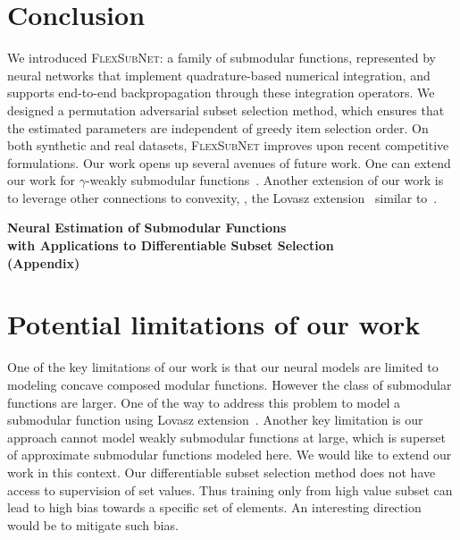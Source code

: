 \documentclass{article}
\newcommand{\our}{\textsc{Flex\-Sub\-Net}}
\renewcommand{\cite}{\citep}
\def\ztitle{Neural Estimation of Submodular Functions\\ with Applications to  Differentiable Subset Selection}
\begin{document}
% 
\section{Conclusion}
\label{sec:end}

We introduced \our: a family of submodular functions, represented by neural networks that implement quadrature-based numerical integration, and supports end-to-end backpropagation through these integration operators. We designed a permutation adversarial subset selection method, which ensures that the estimated parameters are independent of greedy item selection order.  On both synthetic and real datasets, \our{} improves upon recent competitive formulations. 
%
Our work opens up several avenues of future work.  One can extend our work for $\gamma$-weakly submodular functions~\cite{elenberg2016restricted}. 
Another  extension of our work is to leverage other connections to convexity, \eg, the Lovasz extension~\cite{lovas0,bach2} similar to~\citet{karalias2021neural}.


\newpage
%
%




 
\newpage
\onecolumn
\appendix
% 

\begin{center}
\Large\bfseries\ztitle \\ (Appendix)\\
\end{center}



 \section{Potential limitations of our work}
\label{app:our-lim}

One of the key limitations of our work is that our neural models are limited to modeling concave composed modular functions. However the class of submodular functions are larger. One of the way to address this problem to model a submodular function using Lovasz extension~\cite{lovas0,lovas1}. Another key limitation is our approach cannot model weakly submodular functions at large, which is superset of approximate submodular functions modeled here. We would like to extend our work in this context. Our differentiable subset selection method does not have access to supervision of set values. Thus training only from high value subset can lead to high bias towards a specific set of elements. An interesting direction would be to mitigate such bias.
\end{document}
